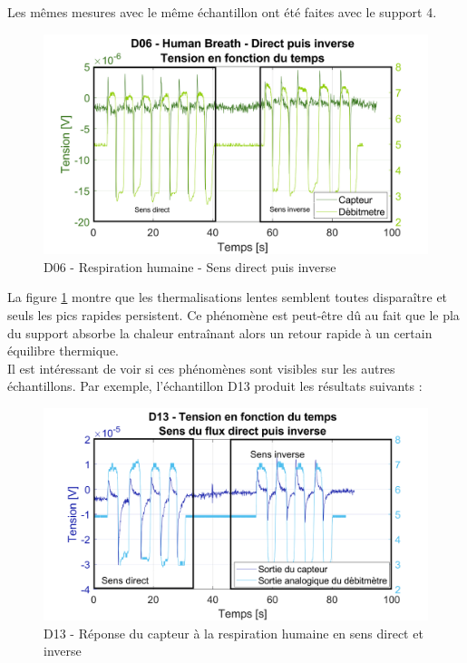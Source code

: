 \newpage
Les mêmes mesures avec le même échantillon ont été faites avec le support 4. 
\begin{figure}[H]
    \centering
    \includegraphics[scale = 0.6]{assets/figures/D06_hb_direct_inverse_green.svg}
    \caption{D06 - Respiration humaine - Sens direct puis inverse}
    \label{fig:d06_hb_dirInv}
\end{figure}
La figure \ref{fig:d06_hb_dirInv} montre que les thermalisations lentes semblent toutes disparaître et seuls les pics rapides persistent. Ce phénomène est peut-être dû au fait que le 
\gls{pla} du support absorbe la chaleur entraînant alors un retour rapide à un certain équilibre thermique. \\

Il est intéressant de voir si ces phénomènes sont visibles sur les autres échantillons. Par exemple, l'échantillon D13 produit les résultats suivants :
\begin{figure}[H]
    \centering
    \includegraphics[scale = 0.6]{assets/figures/D13_human_breath_direct_invert_blue.svg}
    \caption{D13 - Réponse du capteur à la respiration humaine en sens direct et inverse}
    \label{fig:D13_human_breath_direct_invert}
\end{figure}

